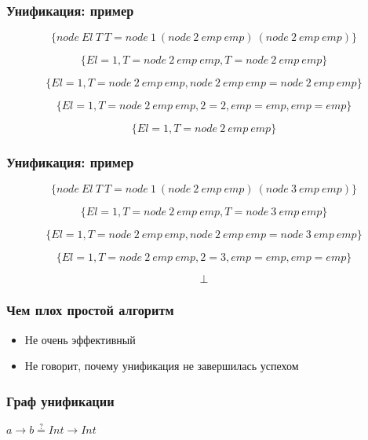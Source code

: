 \documentclass{beamer}
\newcommand{\iseq}{\stackrel{?}{=}}
\begin{document}
\begin{frame}[fragile]
  \frametitle{Унификация: пример}
\[
  \{ node \ El \ T \ T = node \ 1 \ (node \ 2 \ emp \ emp) \ (node \ 2 \ emp \ emp) \}
\]

\[
  \{ El = 1, T = node \ 2 \ emp \ emp, T = node \ 2 \ emp \ emp \}
\]

\[
  \{ El = 1, T = node \ 2 \ emp \ emp, node \ 2 \ emp \ emp = node \ 2 \ emp \ emp \}
\]

\[
  \{ El = 1, T = node \ 2 \ emp \ emp, 2 = 2, emp = emp, emp = emp \}
\]

\[
  \{ El = 1, T = node \ 2 \ emp \ emp \}
\]
\end{frame}


\begin{frame}[fragile]
  \frametitle{Унификация: пример}
\[
  \{ node \ El \ T \ T = node \ 1 \ (node \ 2 \ emp \ emp) \ (node \ 3 \ emp \ emp) \}
\]

\[
  \{ El = 1, T = node \ 2 \ emp \ emp, T = node \ 3 \ emp \ emp \}
\]

\[
  \{ El = 1, T = node \ 2 \ emp \ emp, node \ 2 \ emp \ emp = node \ 3 \ emp \ emp \}
\]

\[
  \{ El = 1, T = node \ 2 \ emp \ emp, 2 = 3, emp = emp, emp = emp \}
\]

\[
  \bot
\]
\end{frame}


\begin{frame}[fragile]
  \frametitle{Чем плох простой алгоритм}
  \begin{itemize}
    \item Не очень эффективный
    \item Не говорит, почему унификация не завершилась успехом
  \end{itemize}
\end{frame}


\begin{frame}[fragile]
  \frametitle{Граф унификации}
\begin{center}
  $a \to b \iseq Int \to Int$
\end{center}

\bigskip

\begin{center}

\end{center}
\end{frame}
\end{document}
